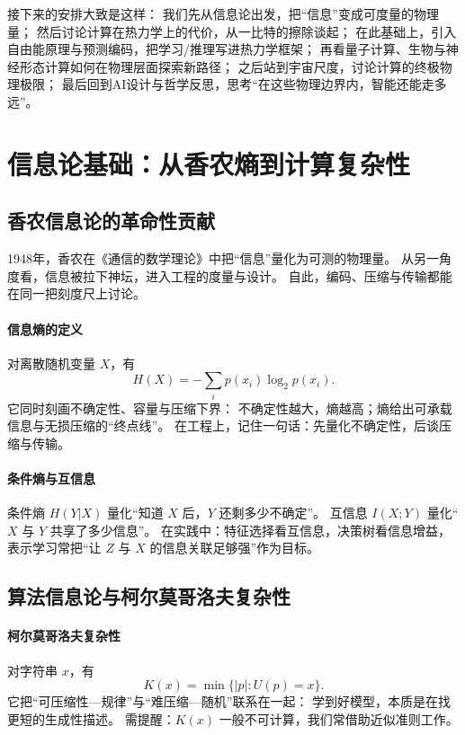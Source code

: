 接下来的安排大致是这样：  
我们先从信息论出发，把“信息”变成可度量的物理量；  
然后讨论计算在热力学上的代价，从一比特的擦除谈起；  
在此基础上，引入自由能原理与预测编码，把学习/推理写进热力学框架；  
再看量子计算、生物与神经形态计算如何在物理层面探索新路径；  
之后站到宇宙尺度，讨论计算的终极物理极限；  
最后回到AI设计与哲学反思，思考“在这些物理边界内，智能还能走多远”。

\section{信息论基础：从香农熵到计算复杂性}

\subsection{香农信息论的革命性贡献}

1948年，香农在《通信的数学理论》中把“信息”量化为可测的物理量。  
从另一角度看，信息被拉下神坛，进入工程的度量与设计。  
自此，编码、压缩与传输都能在同一把刻度尺上讨论。

\paragraph{信息熵的定义}
对离散随机变量 $X$，有
$$H(X) = -\sum_{i} p(x_i)\log_2 p(x_i).$$
它同时刻画不确定性、容量与压缩下界：  
不确定性越大，熵越高；熵给出可承载信息与无损压缩的“终点线”。  
在工程上，记住一句话：先量化不确定性，后谈压缩与传输。

\paragraph{条件熵与互信息}
条件熵 $H(Y|X)$ 量化“知道 $X$ 后，$Y$ 还剩多少不确定”。  
互信息 $I(X;Y)$ 量化“$X$ 与 $Y$ 共享了多少信息”。  
在实践中：特征选择看互信息，决策树看信息增益，  
表示学习常把“让 $Z$ 与 $X$ 的信息关联足够强”作为目标。

\subsection{算法信息论与柯尔莫哥洛夫复杂性}

\paragraph{柯尔莫哥洛夫复杂性}
对字符串 $x$，有
$$K(x)=\min\{|p|:U(p)=x\}.$$
它把“可压缩性—规律”与“难压缩—随机”联系在一起：  
学到好模型，本质是在找更短的生成性描述。  
需提醒：$K(x)$ 一般不可计算，我们常借助近似准则工作。


